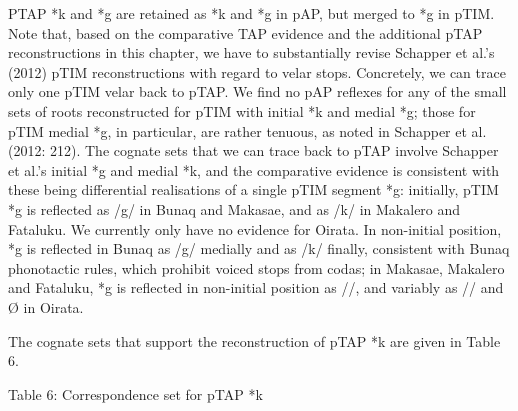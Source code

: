 PTAP *k and *g are retained as *k and *g in pAP, but merged to *g in pTIM. Note that, based on the comparative TAP evidence and the additional pTAP reconstructions in this chapter, we have to substantially revise Schapper et al.{\textquoteright}s (2012) pTIM reconstructions with regard to velar stops. Concretely, we can trace only one pTIM velar back to pTAP. We find no pAP reflexes for any of the small sets of roots reconstructed for pTIM with initial *k and medial *g; those for pTIM medial *g, in particular, are rather tenuous, as noted in Schapper et al. (2012: 212). The cognate sets that we can trace back to pTAP involve Schapper et al.{\textquoteright}s initial *g and medial *k, and the comparative evidence is consistent with these being differential realisations of a single pTIM segment *g: initially, pTIM *g is reflected as /g/ in Bunaq and Makasae, and as /k/ in Makalero and Fataluku. We currently only have no evidence for Oirata. In non-initial position, *g is reflected in Bunaq as /g/ medially and 
as /k/ finally, consistent with Bunaq phonotactic rules, which prohibit voiced stops from codas; in Makasae, Makalero and Fataluku, *g is reflected in non-initial position as /{\textglotstop}/, and variably as /{\textglotstop}/ and {\O} in Oirata. 

The cognate sets that support the reconstruction of pTAP *k are given in Table 6. 

{\centering
Table 6: Correspondence set for pTAP *k
\par}

